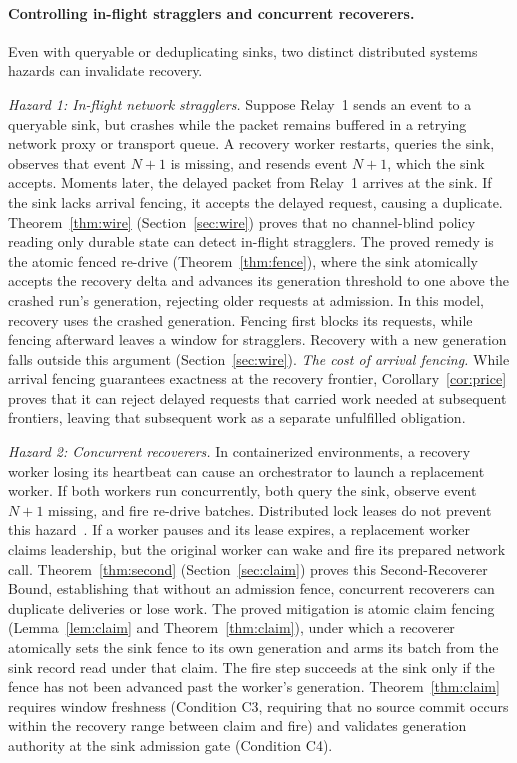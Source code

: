 \documentclass[sigplan,10pt]{acmart}
\theoremstyle{plain}
\theoremstyle{definition}
\begin{document}
\paragraph{Controlling in-flight stragglers and concurrent recoverers.}
Even with queryable or deduplicating sinks, two distinct distributed systems
hazards can invalidate recovery.

\emph{Hazard 1: In-flight network stragglers.}
Suppose Relay~1 sends an event to a queryable sink, but crashes while the
packet remains buffered in a retrying network proxy or transport queue.
A recovery worker restarts, queries the sink, observes that event $N+1$ is
missing, and resends event $N+1$, which the sink accepts. Moments later, the
delayed packet from Relay~1 arrives at the sink. If the sink lacks arrival
fencing, it accepts the delayed request, causing a duplicate.
Theorem~\ref{thm:wire} (Section~\ref{sec:wire}) proves that no channel-blind
policy reading only durable state can detect in-flight stragglers. The proved
remedy is the atomic fenced re-drive (Theorem~\ref{thm:fence}), where the sink
atomically accepts the recovery delta and advances its generation threshold to
one above the crashed run's generation, rejecting older requests at
admission. In this model, recovery uses the crashed generation. Fencing first
blocks its requests, while fencing afterward leaves a window for stragglers.
Recovery with a new generation falls outside this argument
(Section~\ref{sec:wire}).
\emph{The cost of arrival fencing.} While arrival fencing guarantees
exactness at the recovery frontier, Corollary~\ref{cor:price} proves that it
can reject delayed requests that carried work needed at subsequent frontiers,
leaving that subsequent work as a separate unfulfilled obligation.

\emph{Hazard 2: Concurrent recoverers.}
In containerized environments, a recovery worker losing its heartbeat can
cause an orchestrator to launch a replacement worker. If both workers run
concurrently, both query the sink, observe event $N+1$ missing, and fire
re-drive batches.
Distributed lock leases do not prevent this hazard~\cite{klepp-lock}. If a
worker pauses and its lease expires, a replacement worker claims leadership,
but the original worker can wake and fire its prepared network call.
Theorem~\ref{thm:second} (Section~\ref{sec:claim}) proves this
Second-Recoverer Bound, establishing that without an admission fence,
concurrent recoverers can duplicate deliveries or lose work. The proved
mitigation is atomic claim fencing (Lemma~\ref{lem:claim} and
Theorem~\ref{thm:claim}), under which a recoverer atomically sets the sink fence
to its own generation and arms its batch from the sink record read under that
claim. The fire step succeeds at the sink only if the fence has not been
advanced past the worker's generation.
Theorem~\ref{thm:claim} requires window freshness (Condition C3, requiring that no
source commit occurs within the recovery range between claim and fire) and
validates generation authority at the sink admission gate (Condition C4).
\end{document}
